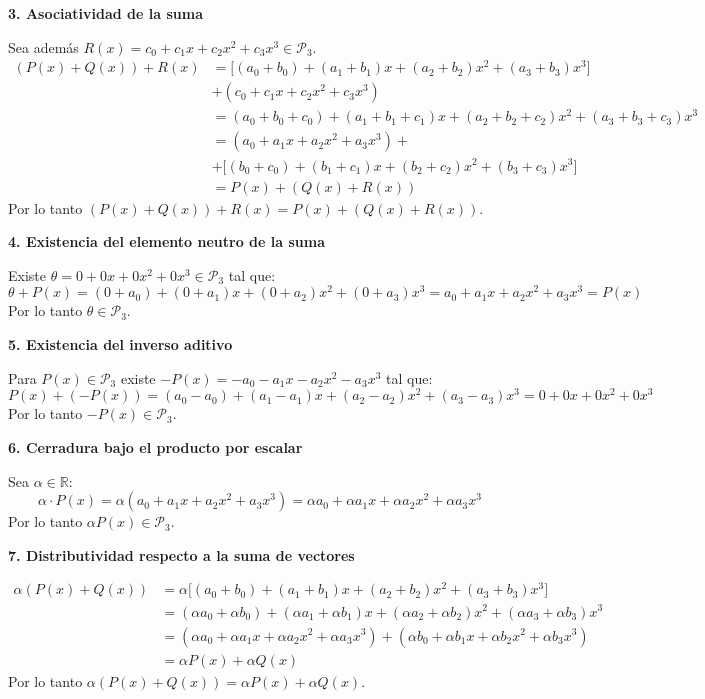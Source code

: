\documentclass[12pt]{article}
\begin{document}
\begin{enumerate}[label=\alph*.-]
    \textbf{3. Asociatividad de la suma}

    Sea además $R(x)=c_0+c_1x+c_2x^2+c_3x^3 \in \mathcal{P}_3$.
    \begin{align*}
    (P(x)+Q(x))+R(x) &= \big[(a_0+b_0)+(a_1+b_1)x+(a_2+b_2)x^2+(a_3+b_3)x^3\big]\\
				&+(c_0+c_1x+c_2x^2+c_3x^3)\\
    &= (a_0+b_0+c_0)+(a_1+b_1+c_1)x+(a_2+b_2+c_2)x^2+(a_3+b_3+c_3)x^3\\
    &= (a_0+a_1x+a_2x^2+a_3x^3)+\\
				&+\big[(b_0+c_0)+(b_1+c_1)x+(b_2+c_2)x^2+(b_3+c_3)x^3\big]\\
    &= P(x)+(Q(x)+R(x))
    \end{align*}
    Por lo tanto $(P(x)+Q(x))+R(x)=P(x)+(Q(x)+R(x))$.

    \textbf{4. Existencia del elemento neutro de la suma}

    Existe $\theta=0+0x+0x^2+0x^3 \in \mathcal{P}_3$ tal que:
    \[
    \theta+P(x) = (0+a_0)+(0+a_1)x+(0+a_2)x^2+(0+a_3)x^3 = a_0+a_1x+a_2x^2+a_3x^3 = P(x)
    \]
    Por lo tanto $\theta \in \mathcal{P}_3$.

    \textbf{5. Existencia del inverso aditivo}

    Para $P(x)\in \mathcal{P}_3$ existe $-P(x)=-a_0-a_1x-a_2x^2-a_3x^3$ tal que:
    \[
    P(x)+(-P(x)) = (a_0-a_0)+(a_1-a_1)x+(a_2-a_2)x^2+(a_3-a_3)x^3 = 0+0x+0x^2+0x^3
    \]
    Por lo tanto $-P(x) \in \mathcal{P}_3$.

    \textbf{6. Cerradura bajo el producto por escalar}

    Sea $\alpha \in \mathbb{R}$:
    \[
    \alpha \cdot P(x) = \alpha(a_0+a_1x+a_2x^2+a_3x^3) = \alpha a_0+\alpha a_1 x+\alpha a_2 x^2+\alpha a_3 x^3
    \]
    Por lo tanto $\alpha P(x) \in \mathcal{P}_3$.

    \textbf{7. Distributividad respecto a la suma de vectores}

    \begin{align*}
    \alpha(P(x)+Q(x)) &= \alpha\big[(a_0+b_0)+(a_1+b_1)x+(a_2+b_2)x^2+(a_3+b_3)x^3\big]\\
    &= (\alpha a_0+\alpha b_0)+(\alpha a_1+\alpha b_1)x+(\alpha a_2+\alpha b_2)x^2+(\alpha a_3+\alpha b_3)x^3\\
    &= (\alpha a_0+\alpha a_1x+\alpha a_2x^2+\alpha a_3x^3)+(\alpha b_0+\alpha b_1x+\alpha b_2x^2+\alpha b_3x^3)\\
    &= \alpha P(x)+\alpha Q(x)
    \end{align*}
    Por lo tanto $\alpha(P(x)+Q(x))=\alpha P(x)+\alpha Q(x)$.


\end{enumerate}
\end{document}
